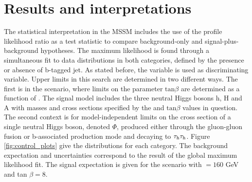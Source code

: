 \section{Results and interpretations}
\label{sec:analysis_results}

The statistical interpretation in the MSSM includes the use of the profile likelihood ratio as a test statistic to compare background-only and signal-plus-background hypotheses. The maximum likelihood is found through a simultaneous fit to data distributions in both categories, defined by the presence or absence of b-tagged jet. As stated before, the variable \mttot is used as discriminating variable. Upper limits in this search are determined in two different ways. The first is in the \mhmax scenario, where limits on the parameter  $\mathrm{tan}\beta$ are determined as a function of \ma. The signal model includes the three neutral Higgs bosons h, H and A with masses and cross sections specified by the \ma and $\mathrm{tan}\beta$ values in question. The second context is for model-independent limits on the cross section of a single neutral Higgs boson, denoted $\Phi$, produced either through the gluon-gluon fusion or b-associated production mode and decaying to $\tau_{\rm h}\tau_{\rm h}$. Figure \ref{fig:control_plots} give the \mttot distributions for each category. The background expectation and uncertainties correspond to the result of the global maximum likelihood fit. The signal expectation is given for the \mhmax scenario with \ma $= 160$ GeV and tan $\beta = 8$.


